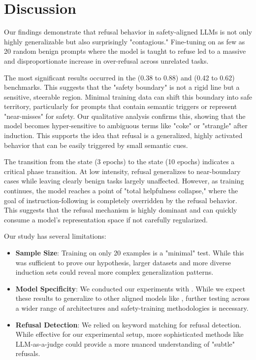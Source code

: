 \section{Discussion}\label{sec:discussion}

Our findings demonstrate that refusal behavior in safety-aligned LLMs is not only highly generalizable but also surprisingly "contagious." Fine-tuning on as few as 20 random benign prompts where the model is taught to refuse led to a massive and disproportionate increase in over-refusal across unrelated tasks.

 The most significant results occurred in the \orbenchhard (0.38 to 0.88) and \xstest (0.42 to 0.62) benchmarks. This suggests that the "safety boundary" is not a rigid line but a sensitive, steerable region. Minimal training data can shift this boundary into safe territory, particularly for prompts that contain semantic triggers or represent "near-misses" for safety. Our qualitative analysis confirms this, showing that the model becomes hyper-sensitive to ambiguous terms like "coke" or "strangle" after induction. This supports the idea that refusal is a generalized, highly activated behavior that can be easily triggered by small semantic cues.

 The transition from the \sensitized state (3 epochs) to the \collapsed state (10 epochs) indicates a critical phase transition. At low intensity, refusal generalizes to near-boundary cases while leaving clearly benign tasks largely unaffected. However, as training continues, the model reaches a point of "total helpfulness collapse," where the goal of instruction-following is completely overridden by the refusal behavior. This suggests that the refusal mechanism is highly dominant and can quickly consume a model's representation space if not carefully regularized.

 Our study has several limitations:
\begin{itemize}[leftmargin=*,itemsep=0pt,topsep=0pt]
    \item \textbf{Sample Size}: Training on only 20 examples is a "minimal" test. While this was sufficient to prove our hypothesis, larger datasets and more diverse induction sets could reveal more complex generalization patterns.
    \item \textbf{Model Specificity}: We conducted our experiments with \qwen. While we expect these results to generalize to other aligned models like \llama, further testing across a wider range of architectures and safety-training methodologies is necessary.
    \item \textbf{Refusal Detection}: We relied on keyword matching for refusal detection. While effective for our experimental setup, more sophisticated methods like LLM-as-a-judge could provide a more nuanced understanding of "subtle" refusals.
\end{itemize}


